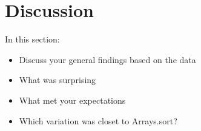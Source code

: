 \documentclass[a4paper,10pt]{article}
\begin{document}

\section{Discussion} %
\label{sec:discussion}

In this section:
\begin{itemize}
	\item Discuss your general findings based on the data
	\item What was surprising
	\item What met your expectations
	\item Which variation was closet to Arrays.sort?
\end{itemize}




\end{document}
